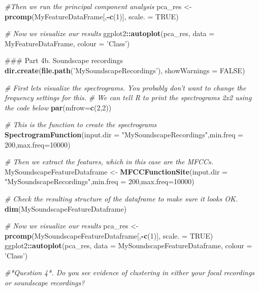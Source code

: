 \documentclass[]{book}
\newenvironment{Shaded}{\begin{snugshade}}{\end{snugshade}}
\newcommand{\CommentTok}[1]{\textcolor[rgb]{0.56,0.35,0.01}{\textit{#1}}}
\newcommand{\DataTypeTok}[1]{\textcolor[rgb]{0.13,0.29,0.53}{#1}}
\newcommand{\DecValTok}[1]{\textcolor[rgb]{0.00,0.00,0.81}{#1}}
\newcommand{\KeywordTok}[1]{\textcolor[rgb]{0.13,0.29,0.53}{\textbf{#1}}}
\newcommand{\NormalTok}[1]{#1}
\newcommand{\OperatorTok}[1]{\textcolor[rgb]{0.81,0.36,0.00}{\textbf{#1}}}
\newcommand{\OtherTok}[1]{\textcolor[rgb]{0.56,0.35,0.01}{#1}}
\newcommand{\StringTok}[1]{\textcolor[rgb]{0.31,0.60,0.02}{#1}}
\begin{document}
\begin{Shaded}
\begin{Highlighting}[]
\CommentTok{#Then we run the principal component analysis}
\NormalTok{pca_res <-}\StringTok{ }\KeywordTok{prcomp}\NormalTok{(MyFeatureDataFrame[,}\OperatorTok{-}\KeywordTok{c}\NormalTok{(}\DecValTok{1}\NormalTok{)], }\DataTypeTok{scale. =} \OtherTok{TRUE}\NormalTok{)}

\CommentTok{# Now we visualize our results}
\NormalTok{ggplot2}\OperatorTok{::}\KeywordTok{autoplot}\NormalTok{(pca_res, }\DataTypeTok{data =}\NormalTok{ MyFeatureDataFrame,}
         \DataTypeTok{colour =} \StringTok{'Class'}\NormalTok{)}


\NormalTok{### Part 4b. Soundscape recordings}
\KeywordTok{dir.create}\NormalTok{(}\KeywordTok{file.path}\NormalTok{(}\StringTok{'MySoundscapeRecordings'}\NormalTok{), }\DataTypeTok{showWarnings =} \OtherTok{FALSE}\NormalTok{)}

\CommentTok{# First lets visualize the spectrograms. You probably don't want to change the frequency settings for this.}
\CommentTok{# We can tell R to print the spectrograms 2x2 using the code below}
\KeywordTok{par}\NormalTok{(}\DataTypeTok{mfrow=}\KeywordTok{c}\NormalTok{(}\DecValTok{2}\NormalTok{,}\DecValTok{2}\NormalTok{))}

\CommentTok{# This is the function to create the spectrograms}
\KeywordTok{SpectrogramFunction}\NormalTok{(}\DataTypeTok{input.dir =} \StringTok{"MySoundscapeRecordings"}\NormalTok{,}\DataTypeTok{min.freq =} \DecValTok{200}\NormalTok{,}\DataTypeTok{max.freq=}\DecValTok{10000}\NormalTok{)}

\CommentTok{# Then we extract the features, which in this case are the MFCCs.}
\NormalTok{MySoundscapeFeatureDataframe <-}\StringTok{ }
\StringTok{  }\KeywordTok{MFCCFunctionSite}\NormalTok{(}\DataTypeTok{input.dir =} \StringTok{"MySoundscapeRecordings"}\NormalTok{,}\DataTypeTok{min.freq =} \DecValTok{200}\NormalTok{,}\DataTypeTok{max.freq=}\DecValTok{10000}\NormalTok{)}

\CommentTok{# Check the resulting structure of the dataframe to make sure it looks OK.}
\KeywordTok{dim}\NormalTok{(MySoundscapeFeatureDataframe)}

\CommentTok{# Now we visualize our results}
\NormalTok{pca_res <-}\StringTok{ }\KeywordTok{prcomp}\NormalTok{(MySoundscapeFeatureDataframe[,}\OperatorTok{-}\KeywordTok{c}\NormalTok{(}\DecValTok{1}\NormalTok{)], }\DataTypeTok{scale. =} \OtherTok{TRUE}\NormalTok{)}
\NormalTok{ggplot2}\OperatorTok{::}\KeywordTok{autoplot}\NormalTok{(pca_res, }\DataTypeTok{data =}\NormalTok{ MySoundscapeFeatureDataframe, }
         \DataTypeTok{colour =} \StringTok{'Class'}\NormalTok{)}

\CommentTok{#*Question 4*. Do you see evidence of clustering in either your focal recordings or soundscape recordings? }
\end{Highlighting}
\end{Shaded}
\end{document}
